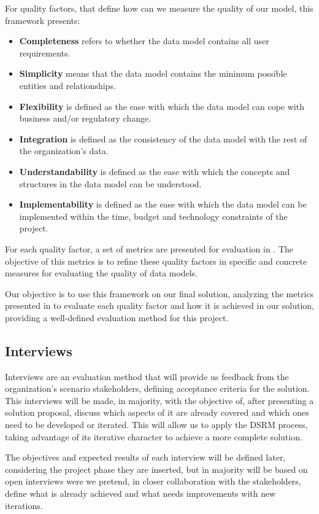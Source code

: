 For quality factors, that define how can we measure the quality of our model, this framework presents:

\begin{itemize}
\item \textbf{Completeness} refers to whether the data model contains all user requirements.
\item \textbf{Simplicity} means that the data model contains the minimum possible entities and relationships.
\item \textbf{Flexibility} is defined as the ease with which the data model can cope with business and/or regulatory change.
\item \textbf{Integration} is defined as the consistency of the data model with the rest of the organization's data.
\item \textbf{Understandability} is defined as the ease with which the concepts and structures in the data model can be understood.
\item \textbf{Implementability} is defined as the ease with which the data model can be implemented within the time, budget and technology constraints of the project.
\end{itemize}

For each quality factor, a set of metrics are presented for evaluation in \cite{moody1998metrics}. The objective of this metrics is to refine these quality factors in specific and concrete measures for evaluating the quality of data models.\par
Our objective is to use this framework on our final solution, analyzing the metrics presented in \cite{moody1998metrics} to evaluate each quality factor and how it is achieved in our solution, providing a well-defined evaluation method for this project.\par

\subsection{Interviews}

Interviews are an evaluation method that will provide us feedback from the organization's scenario stakeholders, defining acceptance criteria for the solution. This interviews will be made, in majority, with the objective of, after presenting a solution proposal, discuss which aspects of it are already covered and which ones need to be developed or iterated. This will allow us to apply the DSRM process, taking advantage of its iterative character to achieve a more complete solution.\par
The objectives and expected results of each interview will be defined later, considering the project phase they are inserted, but in majority will be based on open interviews were we pretend, in closer collaboration with the stakeholders, define what is already achieved and what needs improvements with new iterations.\par  

